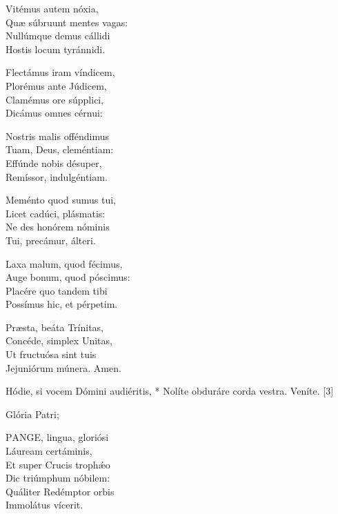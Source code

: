 Vitémus autem nóxia,\\
Quæ súbruunt mentes vagas:\\
Nullúmque demus cállidi\\
Hostis locum tyránnidi.

Flectámus iram víndicem,\\
Plorémus ante Júdicem,\\
Clamémus ore súpplici,\\
Dicámus omnes cérnui:

Nostris malis offéndimus\\
Tuam, Deus, cleméntiam:\\
Effúnde nobis désuper,\\
Remíssor, indulgéntiam.

Meménto quod sumus tui,\\
Licet cadúci, plásmatis:\\
Ne des honórem nóminis\\
Tui, precámur, álteri.

Laxa malum, quod fécimus,\\
Auge bonum, quod póscimus:\\
Placére quo tandem tibi\\
Possímus hic, et pérpetim.

Præsta, beáta Trínitas,\\
Concéde, simplex Unitas,\\
Ut fructuósa sint tuis\\
Jejuniórum múnera. Amen.


 Hódie, si vocem Dómini audiéritis, * Nolíte obduráre corda vestra.  Veníte. [3]


 Glória Patri; 


\lettrine[lines=2]{P}{ANGE}, lingua, gloriósi\\
Láuream certáminis,\\
Et super Crucis trophǽo\\
Dic triúmphum nóbilem:\\
Quáliter Redémptor orbis\\
Immolátus vícerit.

